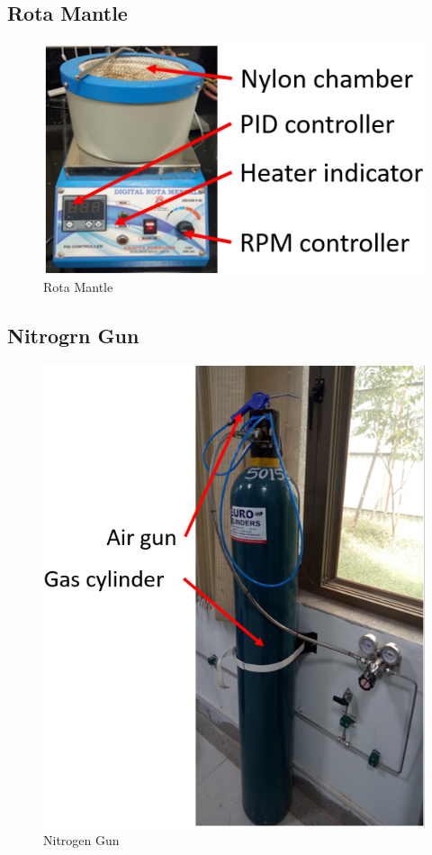 \subsection{Rota Mantle}
\begin{figure}[H]
	\centering
		
		\includegraphics{9.png}
		\caption{Rota Mantle}
\end{figure}
\subsection{Nitrogrn Gun}
\begin{figure}[H]
	\centering
		
		\includegraphics{10.png}
		\caption{Nitrogen Gun}
\end{figure}
